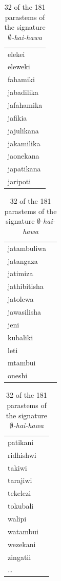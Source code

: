 \documentclass[output=paper,colorlinks,citecolor=brown]{langscibook}
\begin{document}
\begin{table}
\begin{minipage}{.24\textwidth}
\begin{tabular}{l}
elekei \\ 
eleweki \\ 
fahamiki \\ 
jabadilika \\ 
jafahamika \\ 
jafikia \\ 
jajulikana \\ 
jakamilika \\ 
jaonekana \\ 
japatikana \\ 
jaripoti \\ 

\end{tabular}
\end{minipage}
\begin{minipage}{.24\textwidth}
\begin{tabular}{ll}
jatambuliwa \\ 
jatangaza \\ 
jatimiza \\ 
jathibitisha \\ 
jatolewa \\ 
jawasilisha \\ 
jeni \\ 
kubaliki \\ 
leti \\ 
mtambui \\ 
oneshi \\ 
\end{tabular}
\end{minipage}
\begin{minipage}{.24\textwidth}
\begin{tabular}{ll}

patikani \\ 
ridhishwi \\
takiwi \\ 
tarajiwi \\ 
tekelezi \\ 
tokubali \\ 
walipi \\ 
watambui \\ 
wezekani \\ 
zingatii \\ 
\ldots 


\end{tabular}
\end{minipage}
\caption{32 of the 181 parastems of the signature \textit{$\emptyset$-hai-hawa}}
\label{negation3}
\end{table}
\end{document}
